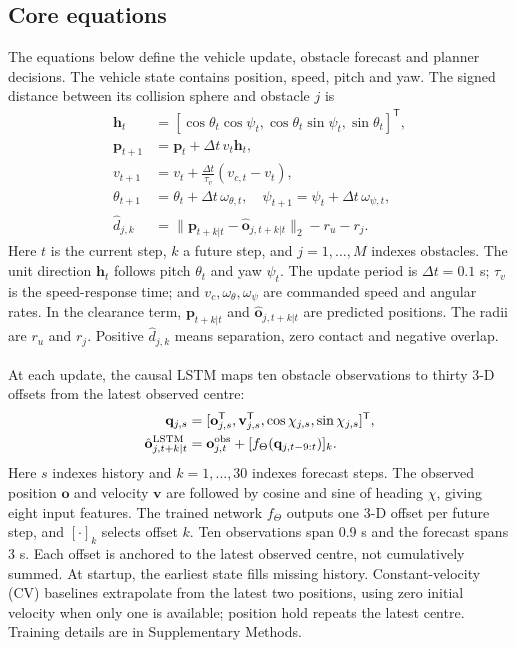 \documentclass[conference,letterpaper]{IEEEtran}
\let\citeplain\cite
\renewcommand{\cite}[1]{\textsuperscript{\citeplain{#1}}}
\begin{document}
\subsection{Core equations}
The equations below define the vehicle update, obstacle forecast and planner decisions. The vehicle state contains position, speed, pitch and yaw. The signed distance between its collision sphere and obstacle $j$ is
\begingroup\small
\begin{equation}
\begin{aligned}
\mathbf h_t&=[\cos\theta_t\cos\psi_t,\cos\theta_t\sin\psi_t,\sin\theta_t]^{\mathsf T},\\
\mathbf p_{t+1}&=\mathbf p_t+\Delta t\,v_t\mathbf h_t,\\
v_{t+1}&=v_t+\frac{\Delta t}{\tau_v}(v_{c,t}-v_t),\\
\theta_{t+1}&=\theta_t+\Delta t\,\omega_{\theta,t},\quad
\psi_{t+1}=\psi_t+\Delta t\,\omega_{\psi,t},\\
\hat d_{j,k}&=\|\mathbf p_{t+k|t}-\hat{\mathbf o}_{j,t+k|t}\|_2-r_u-r_j.
\end{aligned}
\label{eq:model}
\end{equation}
\endgroup
Here $t$ is the current step, $k$ a future step, and $j=1,\ldots,M$ indexes obstacles. The unit direction $\mathbf h_t$ follows pitch $\theta_t$ and yaw $\psi_t$. The update period is $\Delta t=0.1$ s; $\tau_v$ is the speed-response time; and $v_c,\omega_\theta,\omega_\psi$ are commanded speed and angular rates. In the clearance term, $\mathbf p_{t+k|t}$ and $\hat{\mathbf o}_{j,t+k|t}$ are predicted positions. The radii are $r_u$ and $r_j$. Positive $\hat d_{j,k}$ means separation, zero contact and negative overlap.

At each update, the causal LSTM \cite{hochreiter1997} maps ten obstacle observations to thirty 3-D offsets from the latest observed centre:
\begingroup\small
\begin{equation}
\begin{aligned}
\mathbf q_{j,s}&=[\mathbf o_{j,s}^{\mathsf T},\mathbf v_{j,s}^{\mathsf T},\cos\chi_{j,s},\sin\chi_{j,s}]^{\mathsf T},\\
\hat{\mathbf o}^{\rm LSTM}_{j,t+k|t}&=\mathbf o^{\rm obs}_{j,t}+[f_{\Theta}(\mathbf q_{j,t-9:t})]_k.
\end{aligned}
\label{eq:forecast}
\end{equation}
\endgroup
Here $s$ indexes history and $k=1,\ldots,30$ indexes forecast steps. The observed position $\mathbf o$ and velocity $\mathbf v$ are followed by cosine and sine of heading $\chi$, giving eight input features. The trained network $f_\Theta$ outputs one 3-D offset per future step, and $[\cdot]_k$ selects offset $k$. Ten observations span 0.9 s and the forecast spans 3 s. Each offset is anchored to the latest observed centre, not cumulatively summed. At startup, the earliest state fills missing history. Constant-velocity (CV) baselines extrapolate from the latest two positions, using zero initial velocity when only one is available; position hold repeats the latest centre. Training details are in Supplementary Methods.
\end{document}
